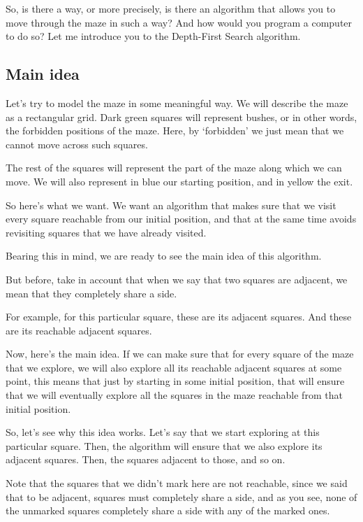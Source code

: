 \documentclass[12pt]{article}
\begin{document}
So, is there a way, or more precisely, is there an algorithm
that allows you to move through the maze in such a way?
And how would you program a computer to do so?
Let me introduce you to the Depth-First Search algorithm.

\subsection{Main idea}

Let's try to model the maze in some meaningful way.
We will describe the maze as a rectangular grid.
Dark green squares will represent bushes,
or in other words, the forbidden positions of the maze.
Here, by `forbidden' we just mean that we cannot move across
such squares.

The rest of the squares will represent
the part of the maze along which we can move.
We will also represent in blue our starting 
position, and in yellow the exit.

So here's what we want. We want an algorithm that makes
sure that we visit every square reachable from our initial position,
and that at the same time
avoids revisiting squares that we have already visited.

Bearing this in mind, we are ready to see the main idea of this algorithm.

But before, take in account that when we say that two squares are adjacent,
we mean that they completely share a side.

For example, for this particular square, these are 
its adjacent squares.
And these are its reachable adjacent squares.

Now, here's the main idea. If we can make sure
that for every square of the maze
that we explore, we will also explore all its 
reachable adjacent squares at some point,
this means that just by starting in some initial position,
that will ensure that we will eventually explore all the squares
in the maze reachable from that initial position.

So, let's see why this idea works.
Let's say that we start exploring at this particular square.
Then, the algorithm will ensure that we also explore its adjacent
squares. Then, the squares adjacent to those, and so on.

Note that the squares that we didn't mark here are not reachable,
since we said that to be adjacent, squares must completely share
a side, and as you see, none of the unmarked squares 
completely share a side with
any of the marked ones.
\end{document}
